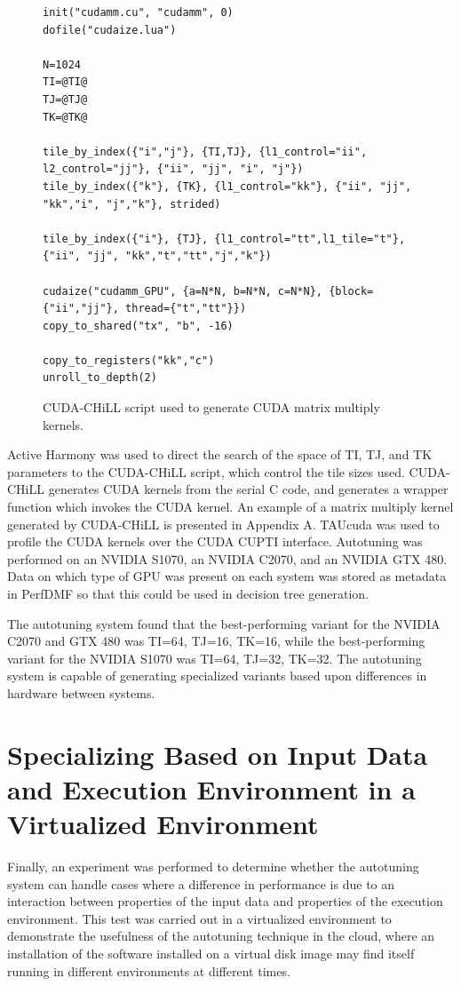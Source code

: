 \documentclass[msthesis,justified,copyright,final,numbers,sort&compress,
gsmodern,amstex,natbib]{uothesis}
\begin{document}
\begin{figure}[btp]
\centering
\scriptsize\begin{verbatim}
init("cudamm.cu", "cudamm", 0) 
dofile("cudaize.lua")

N=1024
TI=@TI@
TJ=@TJ@
TK=@TK@

tile_by_index({"i","j"}, {TI,TJ}, {l1_control="ii", l2_control="jj"}, {"ii", "jj", "i", "j"})
tile_by_index({"k"}, {TK}, {l1_control="kk"}, {"ii", "jj", "kk","i", "j","k"}, strided)

tile_by_index({"i"}, {TJ}, {l1_control="tt",l1_tile="t"}, {"ii", "jj", "kk","t","tt","j","k"})

cudaize("cudamm_GPU", {a=N*N, b=N*N, c=N*N}, {block={"ii","jj"}, thread={"t","tt"}})
copy_to_shared("tx", "b", -16)

copy_to_registers("kk","c")
unroll_to_depth(2)
\end{verbatim}
\caption{CUDA-CHiLL script used to generate CUDA matrix multiply kernels.}
\label{fig:cudascript}
\end{figure}

Active Harmony was used to direct the search of the space of TI, TJ, and TK parameters to the CUDA-CHiLL script, which control the tile sizes used. CUDA-CHiLL generates CUDA kernels from the serial C code, and generates a wrapper function which invokes the CUDA kernel. An example of a matrix multiply kernel generated by CUDA-CHiLL is presented in Appendix A. TAUcuda \cite{taucuda} was used to profile the CUDA kernels over the CUDA CUPTI interface. Autotuning was performed on an NVIDIA S1070, an NVIDIA C2070, and an NVIDIA GTX 480. Data on which type of GPU was present on each system was stored as metadata in PerfDMF so that this could be used in decision tree generation.

The autotuning system found that the best-performing variant for the NVIDIA C2070 and GTX 480 was TI=64, TJ=16, TK=16, while the best-performing variant for the NVIDIA S1070 was TI=64, TJ=32, TK=32. The autotuning system is capable of generating specialized variants based upon differences in hardware between systems.

\section{Specializing Based on Input Data and Execution Environment in a Virtualized Environment}

Finally, an experiment was performed to determine whether the autotuning system can handle cases where a difference in performance is due to an interaction between properties of the input data and properties of the execution environment. This test was carried out in a virtualized environment to demonstrate the usefulness of the autotuning technique in the cloud, where an installation of the software installed on a virtual disk image may find itself running in different environments at different times.
\end{document}
